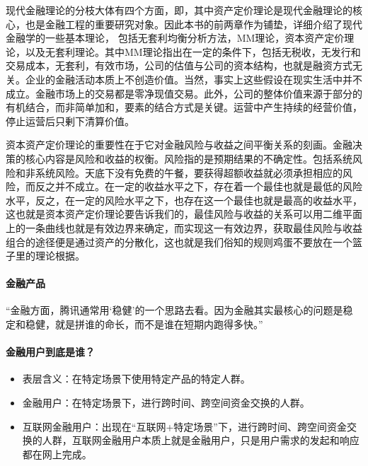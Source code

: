 \documentclass[letterpaper,10pt,english]{sphinxmanual}
\begin{document}
现代金融理论的分枝大体有四个方面，即，其中资产定价理论是现代金融理论的核心，也是金融工程的重要研究对象。因此本书的前两章作为铺垫，详细介绍了现代金融学的一些基本理论，
包括无套利均衡分析方法，MM理论，资本资产定价理论，以及无套利理论。其中MM理论指出在一定的条件下，包括无税收，无发行和交易成本，无套利，有效巿场，公司的估值与公司的资本结构，也就是融资方式无关。企业的金融活动本质上不创造价值。当然，事实上这些假设在现实生活中并不成立。金融市场上的交易都是零净现值交易。此外，公司的整体价值来源于部分的有机结合，而非简单加和，要素的结合方式是关键。运营中产生持续的经营价值，停止运营后只剰下清算价值。

资本资产定价理论的重要性在于它对金融风险与收益之间平衡关系的刻画。金融决策的核心内容是风险和收益的权衡。风险指的是预期结果的不确定性。包括系统风险和非系统风险。天底下没有免费的午餐，要获得超额收益就必须承担相应的风险，而反之并不成立。在一定的收益水平之下，存在着一个最佳也就是最低的风险水平，反之，在一定的风险水平之下，也存在这一个最佳也就是最高的收益水平，这也就是资本资产定价理论要告诉我们的，最佳风险与收益的关系可以用二维平面上的一条曲线也就是有效边界来确定，而实现这一有效边界，获取最佳风险与收益组合的途径便是通过资产的分散化，这也就是我们俗知的规则\sphinxhyphen{}鸡蛋不要放在一个篮子里的理论根据。


\paragraph{金融产品}
\label{\detokenize{chapter_AI+Finance/Finance:id4}}
“金融方面，腾讯通常用‘稳健’的一个思路去看。因为金融其实最核心的问题是稳定和稳健，就是拼谁的命长，而不是谁在短期内跑得多快。”


\paragraph{金融用户到底是谁？}
\label{\detokenize{chapter_AI+Finance/Finance:id5}}\begin{itemize}
\item {} 
表层含义：在特定场景下使用特定产品的特定人群。

\item {} 
金融用户：在特定场景下，进行跨时间、跨空间资金交换的人群。

\item {} 
互联网金融用户：出现在“互联网+特定场景”下，进行跨时间、跨空间资金交换的人群，互联网金融用户本质上就是金融用户，只是用户需求的发起和响应都在网上完成。

\end{itemize}
\end{document}
